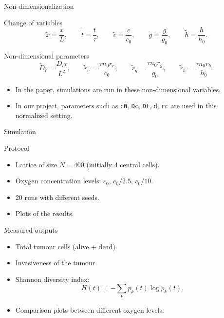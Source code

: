 \documentclass[10pt,aspectratio=169]{beamer}
\begin{document}
\begin{frame}[c]{Non-dimensionalization}
\small
\begin{block}{Change of variables}
\[
\tilde{x}=\frac{x}{L},\qquad
\tilde{t}=\frac{t}{\tau},\qquad
\tilde{c}=\frac{c}{c_0},\qquad
\tilde{g}=\frac{g}{g_0},\qquad
\tilde{h}=\frac{h}{h_0}.
\]
\end{block}
\begin{block}{Non-dimensional parameters}
\[
\tilde{D}_i=\frac{D_i\tau}{L^2},\qquad
\tilde{r}_c=\frac{\tau n_0 r_c}{c_0},\qquad
\tilde{r}_g=\frac{\tau n_0 r_g}{g_0},\qquad
\tilde{r}_h=\frac{\tau n_0 r_h}{h_0}.
\]
\begin{itemize}
  \item In the paper, simulations are run in these non-dimensional variables.
  \item In our project, parameters such as \texttt{c0}, \texttt{Dc}, \texttt{Dt}, \texttt{d}, \texttt{rc} are used in this normalized setting.
\end{itemize}
\end{block}
\end{frame}

\begin{frame}[c]{Simulation}
\begin{block}{Protocol}
\begin{itemize}
  \item Lattice of size $N=400$ (initially 4 central cells).
  \item Oxygen concentration levels: $c_0$, $c_0/2.5$, $c_0/10$.
  \item 20 runs with different seeds.
  \item Plots of the results.
\end{itemize}
\end{block}
\begin{block}{Measured outputs}
\begin{itemize}
  \item Total tumour cells (alive + dead).
  \item Invasiveness of the tumour.
  \item Shannon diversity index:
  \[
  H(t)=-\sum_k p_k(t)\log p_k(t).
  \]
  \item Comparison plots between different oxygen levels.
\end{itemize}
\end{block}
\end{frame}
\end{document}
